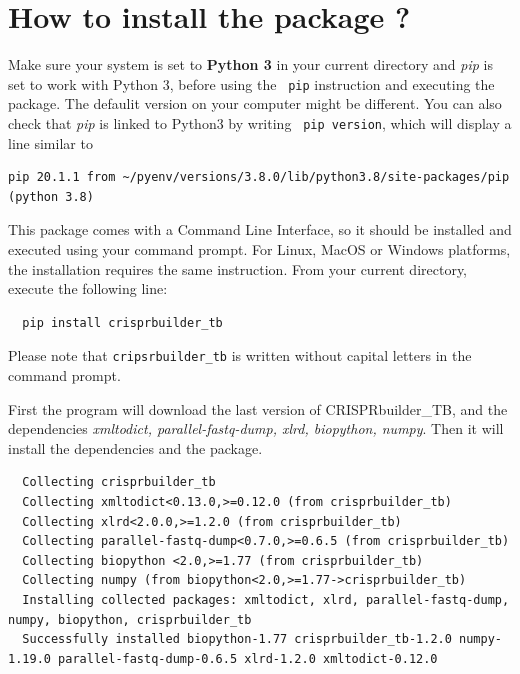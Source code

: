 \documentclass[twoside,a4paper,11pt,frenchb,openany]{report}
\begin{document}
    \section*{How to install the package
?}\label{how-to-install-the-package}

Make sure your system is set to \textbf{Python 3} in your current directory and \textit{pip} is set to work with Python 3, before using the \texttt{ pip} instruction and executing the package. The defaulit version on your computer might be different. You can also check that \textit{pip} is linked to Python3 by writing \texttt{ pip \textemdash \textemdash version}, which will display a line similar to

\begin{verbatim}
pip 20.1.1 from ~/pyenv/versions/3.8.0/lib/python3.8/site-packages/pip (python 3.8)
\end{verbatim}

    This package comes with a Command Line Interface, so it should be
installed and executed using your command prompt. For Linux, MacOS or
Windows platforms, the installation requires the same instruction. From your current directory, execute the following line:

    \begin{verbatim}
  pip install crisprbuilder_tb
\end{verbatim}

    Please note that \texttt{cripsrbuilder\_tb} is written without capital
letters in the command prompt.

First the program will download the last version of CRISPRbuilder\_TB, and the dependencies \textit{xmltodict, parallel-fastq-dump, xlrd, biopython, numpy}. Then it will install the dependencies and the package.

\begin{verbatim}  Collecting crisprbuilder_tb
  Collecting xmltodict<0.13.0,>=0.12.0 (from crisprbuilder_tb)
  Collecting xlrd<2.0.0,>=1.2.0 (from crisprbuilder_tb)
  Collecting parallel-fastq-dump<0.7.0,>=0.6.5 (from crisprbuilder_tb)
  Collecting biopython <2.0,>=1.77 (from crisprbuilder_tb)
  Collecting numpy (from biopython<2.0,>=1.77->crisprbuilder_tb)
  Installing collected packages: xmltodict, xlrd, parallel-fastq-dump, numpy, biopython, crisprbuilder_tb
  Successfully installed biopython-1.77 crisprbuilder_tb-1.2.0 numpy-1.19.0 parallel-fastq-dump-0.6.5 xlrd-1.2.0 xmltodict-0.12.0
\end{verbatim}
\end{document}
